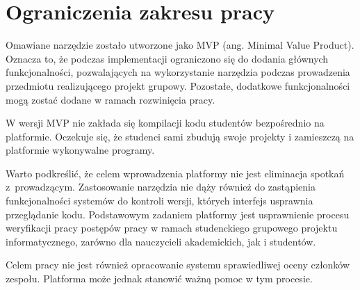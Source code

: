 \section{Ograniczenia zakresu pracy}

Omawiane narzędzie zostało utworzone jako MVP (ang. Minimal Value Product).
Oznacza to, że podczas implementacji ograniczono się do dodania głównych funkcjonalności, pozwalających na wykorzystanie narzędzia podczas prowadzenia przedmiotu realizującego projekt grupowy.
Pozostałe, dodatkowe funkcjonalności mogą zostać dodane w ramach rozwinięcia pracy.

W wersji MVP nie zakłada się kompilacji kodu studentów bezpośrednio na platformie.
Oczekuje się, że studenci sami zbudują swoje projekty i zamieszczą na platformie wykonywalne programy.

Warto podkreślić, że celem wprowadzenia platformy nie jest eliminacja spotkań z~prowadzącym.
Zastosowanie narzędzia nie dąży również do zastąpienia funkcjonalności systemów do kontroli wersji, których interfejs usprawnia przeglądanie kodu.
Podstawowym zadaniem platformy jest usprawnienie procesu weryfikacji pracy postępów pracy w ramach studenckiego grupowego projektu informatycznego, zarówno dla nauczycieli akademickich, jak i studentów.

Celem pracy nie jest również opracowanie systemu sprawiedliwej oceny członków zespołu.
Platforma może jednak stanowić ważną pomoc w tym procesie.




